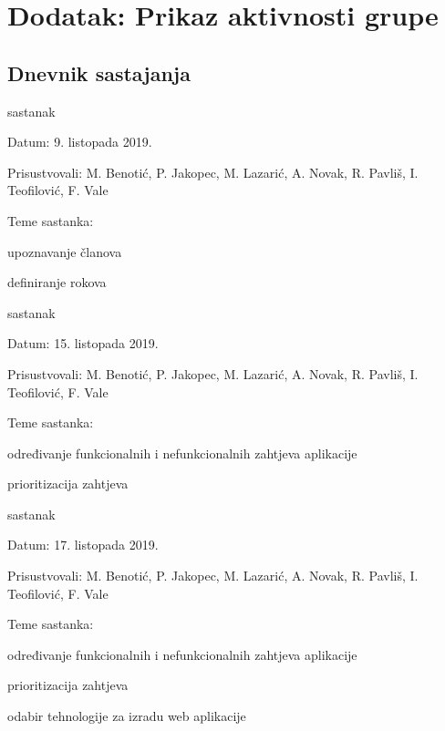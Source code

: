 \chapter*{Dodatak: Prikaz aktivnosti grupe}
		
		\section*{Dnevnik sastajanja}
		
		\newcommand{\imenaSvihClanova}{M. Benotić, P. Jakopec, M. Lazarić, A. Novak, R. Pavliš, I. Teofilović, F. Vale}
		
		\begin{packed_enum}
			\item  sastanak
			\item[] \begin{packed_item}
				\item Datum: 9. listopada 2019.
				\item Prisustvovali: \imenaSvihClanova
				\item Teme sastanka:
				\begin{packed_item}
					\item upoznavanje članova
					\item definiranje rokova
				\end{packed_item}
			\end{packed_item}
		
			\item  sastanak
			\item[] \begin{packed_item}
				\item Datum: 15. listopada 2019.
				\item Prisustvovali: \imenaSvihClanova
				\item Teme sastanka:
				\begin{packed_item}
					\item određivanje funkcionalnih i nefunkcionalnih zahtjeva aplikacije
					\item prioritizacija zahtjeva
				\end{packed_item}
			\end{packed_item}
		
			\item  sastanak
			\item[] \begin{packed_item}
				\item Datum: 17. listopada 2019.
				\item Prisustvovali: \imenaSvihClanova
				\item Teme sastanka:
				\begin{packed_item}
					\item određivanje funkcionalnih i nefunkcionalnih zahtjeva aplikacije
					\item prioritizacija zahtjeva
					\item odabir tehnologije za izradu web aplikacije
				\end{packed_item}
			\end{packed_item}
		

\end{packed_enum}

